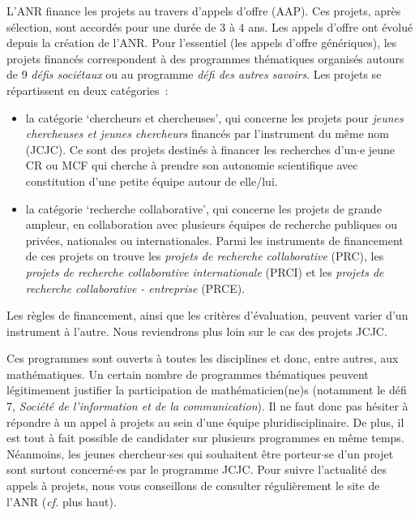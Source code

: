 L'ANR finance les projets au travers d'appels d'offre (AAP). Ces projets, apr\`es s\'election, sont accord\'es pour une dur\'ee de 3 {\`a} 4 ans. Les appels d'offre ont \'evolu\'e depuis la cr\'eation de l'ANR. Pour l'essentiel (les appels d'offre g\'en\'eriques), les projets financ\'es correspondent \`a des programmes th\'ematiques organis\'es autours de 9 {\em d\'efis soci\'etaux} ou au programme {\em d\'efi des autres savoirs}. Les projets se r\'epartissent en deux cat\'egories~:
\begin{itemize}
\item la cat\'egorie `chercheurs et chercheuses', qui concerne les projets pour {\em jeunes chercheuses et jeunes chercheurs} financ\'es par l'instrument du m\^eme nom (JCJC). Ce sont des projets destin\'es \`a financer les recherches d'un$\cdot$e jeune CR ou MCF qui cherche {\`a} prendre son autonomie scientifique avec constitution d'une petite {\'e}quipe autour de elle/lui.
\item la cat\'egorie `recherche collaborative', qui concerne les projets de grande ampleur, en collaboration avec plusieurs \'equipes de recherche publiques ou priv\'ees, nationales ou internationales. Parmi les instruments de financement de ces projets on trouve les {\em projets de recherche collaborative} (PRC), les {\em projets de recherche collaborative internationale} (PRCI) et les {\em projets de recherche collaborative - entreprise} (PRCE).
\end{itemize}

Les r\`egles de financement, ainsi que les crit\`eres
d'\'evaluation, peuvent varier d'un instrument \`a l'autre. Nous reviendrons plus loin sur le cas des projets JCJC.

Ces programmes sont ouverts \`a toutes les disciplines et donc, entre autres,
aux math\'ematiques. Un certain nombre de programmes th\'ematiques
peuvent l\'egitimement justifier la participation de math\'ematicien(ne)s (notamment le d\'efi 7, {\em Soci\'et\'e de l'information et de la communication}).
Il ne faut donc pas h\'esiter \`a r\'epondre
\`a un appel \` a projets au sein d'une \'equipe pluridisciplinaire. De plus, il est tout \`a
fait possible de candidater sur plusieurs programmes en m\^eme temps.
N\'eanmoins, les jeunes chercheur$\cdot$ses qui souhaitent \^etre porteur$\cdot$se d'un projet sont surtout concern\'e$\cdot$es par le programme JCJC.
Pour suivre l'actualit\'e des appels \`a projets, nous vous conseillons de
consulter r\'eguli\`erement le site de l'ANR ({\em cf.} plus haut).
\\

